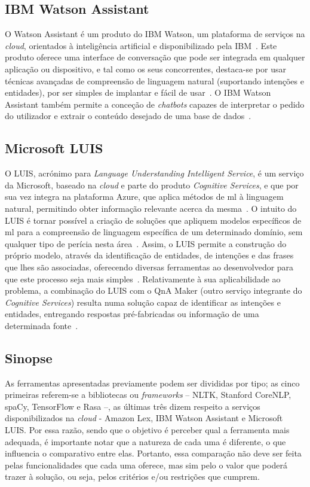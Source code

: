 \subsection{IBM Watson Assistant}
O Watson Assistant é um produto do IBM Watson, um plataforma de serviços na \textit{cloud}, orientados à inteligência artificial e disponibilizado pela IBM~\parencite{ibm_watson_official}. Este produto oferece uma interface de conversação que pode ser integrada em qualquer aplicação ou dispositivo, e tal como os seus concorrentes, destaca-se por usar técnicas avançadas de compreensão de linguagem natural (suportando intenções e entidades), por ser simples de implantar e fácil de usar~\parencite{ibm_watson_assistant_official}. O IBM Watson Assistant também permite a conceção de \textit{chatbots} capazes de interpretar o pedido do utilizador e extrair o conteúdo desejado de uma base de dados~\parencite{ibm_watson_assistant_database_driven_chatbot}.

\subsection{Microsoft LUIS}
O LUIS, acrónimo para \textit{Language Understanding Intelligent Service}, é um serviço da Microsoft, baseado na \textit{cloud} e parte do produto \textit{Cognitive Services}, e que por sua vez integra na plataforma Azure, que aplica métodos de \gls{ml} à linguagem natural, permitindo obter informação relevante acerca da mesma~\parencite{microsoft_luis_official}. O intuito do LUIS é tornar possível a criação de soluções que apliquem modelos específicos de \gls{ml} para a compreensão de linguagem específica de um determinado domínio, sem qualquer tipo de perícia nesta área~\parencite{luis_fast_easy_language_understanding}. Assim, o LUIS permite a construção do próprio modelo, através da identificação de entidades, de intenções e das frases que lhes são associadas, oferecendo diversas ferramentas ao desenvolvedor para que este processo seja mais simples~\parencite{microsoft_luis_official}. Relativamente à sua aplicabilidade ao problema, a combinação do LUIS com o QnA Maker (outro serviço integrante do \textit{Cognitive Services}) resulta numa solução capaz de identificar as intenções e entidades, entregando respostas pré-fabricadas ou informação de uma determinada fonte~\parencite{microsoft_luis_use_nl_processing_service}.

\subsection{Sinopse}
As ferramentas apresentadas previamente podem ser divididas por tipo; as cinco primeiras referem-se a bibliotecas ou \textit{frameworks} -- NLTK, Stanford CoreNLP, spaCy, TensorFlow e Rasa --, as últimas três dizem respeito a serviços disponibilizados na \textit{cloud} - Amazon Lex, IBM Watson Assistant e Microsoft LUIS. Por essa razão, sendo que o objetivo é perceber qual a ferramenta mais adequada, é importante notar que a natureza de cada uma é diferente, o que influencia o comparativo entre elas. Portanto, essa comparação não deve ser feita pelas funcionalidades que cada uma oferece, mas sim pelo o valor que poderá trazer à solução, ou seja, pelos critérios e/ou restrições que cumprem.

